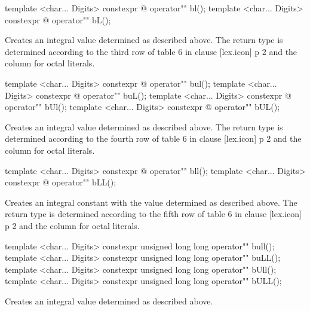 \documentclass[ebook,11pt,article]{memoir}
\begin{document}
\begin{itemdecl}
template <char... Digits>
constexpr @\seebelow@ 
operator"" bl();
template <char... Digits>
constexpr @\seebelow@ 
operator"" bL();
\end{itemdecl}

\begin{itemdescr}
\pnum
\effects
Creates an integral value determined as described above. The return type is determined according to the third row of table 6 in clause [lex.icon] p 2 and the column for octal literals. 
\end{itemdescr}

\begin{itemdecl}
template <char... Digits>
constexpr @\seebelow@ 
operator"" bul();
template <char... Digits>
constexpr @\seebelow@ 
operator"" buL();
template <char... Digits>
constexpr @\seebelow@ 
operator"" bUl();
template <char... Digits>
constexpr @\seebelow@ 
operator"" bUL();
\end{itemdecl}

\begin{itemdescr}
\pnum
\effects
Creates an integral value determined as described above. The return type is determined according to the fourth row of table 6 in clause [lex.icon] p 2 and the column for octal literals. 
\end{itemdescr}

\begin{itemdecl}
template <char... Digits>
constexpr @\seebelow@ 
operator"" bll();
template <char... Digits>
constexpr @\seebelow@ 
operator"" bLL();
\end{itemdecl}

\begin{itemdescr}
\pnum
\effects
Creates an integral constant with the value determined as described above. The return type is determined according to the fifth row of table 6 in clause [lex.icon] p 2 and the column for octal literals. 
\end{itemdescr}
\begin{itemdecl}
template <char... Digits>
constexpr unsigned long long
operator"" bull();
template <char... Digits>
constexpr unsigned long long
operator"" buLL();
template <char... Digits>
constexpr unsigned long long
operator"" bUll();
template <char... Digits>
constexpr unsigned long long
operator"" bULL();
\end{itemdecl}

\begin{itemdescr}
\pnum
\effects
Creates an integral value determined as described above. 
\end{itemdescr}
\end{document}
